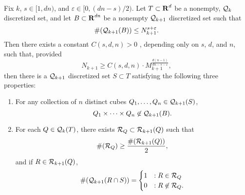 \begin{lemma} \label{discretelemma}
	Fix $k$, $s \in [1,dn)$, and $\varepsilon \in [0,(dn-s)/2)$. Let $T \subset \operatorname{\mathbf{R}}^d$ be a nonempty, $\operatorname{\mathcal{Q}}_k$ discretized set, and let $B \subset \operatorname{\mathbf{R}}^{dn}$ be a nonempty $\operatorname{\mathcal{Q}}_{k+1}$ discretized set such that
	\[ \#(\operatorname{\mathcal{Q}}_{k+1}(B)) \leq N_{k+1}^{s + \varepsilon}. \]
	Then there exists a constant $C(s,d,n) > 0$%
	, depending only on $s$, $d$, and $n$, such that, provided
	\begin{equation} \label{rBound}
		N_{k+1} \geq C(s,d,n) \cdot M_{k+1}^{\frac{d(n-1)}{dn - s - \varepsilon}},
	\end{equation}
	then there is a $\operatorname{\mathcal{Q}}_{k+1}$ discretized set $S \subset T$ satisfying the following three properties:
	\begin{enumerate}
		\item\label{avoidanceItem} For any collection of $n$ distinct cubes $Q_1, \dots, Q_n \in \operatorname{\mathcal{Q}}_{k+1}(S)$,
		\[ Q_1 \times \dots \times Q_n \not \in \operatorname{\mathcal{Q}}_{k+1}(B). \]

		\item\label{nonConcentrationItem} For each $Q \in \operatorname{\mathcal{Q}}_k(T)$, there exists $\mathcal{R}_Q \subset \operatorname{\mathcal{R}}_{k+1}(Q)$ such that
		\[ \#(\mathcal{R}_Q) \geq \frac{\#(\operatorname{\mathcal{R}}_{k+1}(Q))}{2}, \]
		and if $R \in \operatorname{\mathcal{R}}_{k+1}(Q)$,
		\[ \#(\operatorname{\mathcal{Q}}_{k+1}(R \cap S)) = \begin{cases} 1 & : R \in \mathcal{R}_Q \\ 0 & : R \not \in \mathcal{R}_Q. \end{cases} \]
	\end{enumerate}
\end{lemma}

